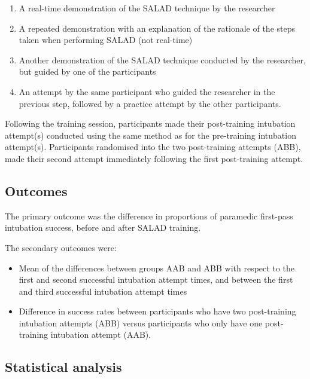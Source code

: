 \documentclass[]{article}
\providecommand{\tightlist}{%
  \setlength{\itemsep}{0pt}\setlength{\parskip}{0pt}}
\begin{document}
\begin{enumerate}
\def\labelenumi{\arabic{enumi}.}
\tightlist
\item
  A real-time demonstration of the SALAD technique by the researcher
\item
  A repeated demonstration with an explanation of the rationale of the
  steps taken when performing SALAD (not real-time)
\item
  Another demonstration of the SALAD technique conducted by the
  researcher, but guided by one of the participants
\item
  An attempt by the same participant who guided the researcher in the
  previous step, followed by a practice attempt by the other
  participants.
\end{enumerate}

Following the training session, participants made their post-training
intubation attempt(s) conducted using the same method as for the
pre-training intubation attempt(s). Participants randomised into the two
post-training attempts (ABB), made their second attempt immediately
following the first post-training attempt.

\hypertarget{outcomes}{%
\subsection{Outcomes}\label{outcomes}}

The primary outcome was the difference in proportions of paramedic
first-pass intubation success, before and after SALAD training.

The secondary outcomes were:

\begin{itemize}
\tightlist
\item
  Mean of the differences between groups AAB and ABB with respect to the
  first and second successful intubation attempt times, and between the
  first and third successful intubation attempt times
\item
  Difference in success rates between participants who have two
  post-training intubation attempts (ABB) versus participants who only
  have one post-training intubation attempt (AAB).
\end{itemize}

\hypertarget{statistical-analysis}{%
\subsection{Statistical analysis}\label{statistical-analysis}}
\end{document}
